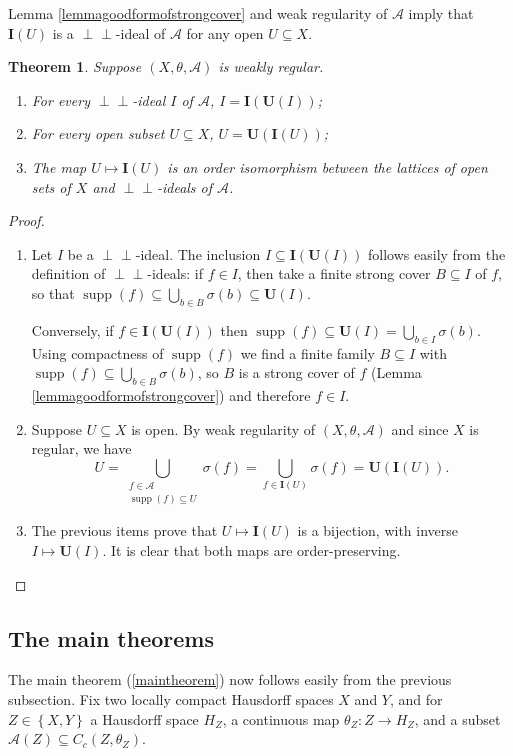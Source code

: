 \documentclass[letter,11pt]{amsart}
\theoremstyle{plain}		\newtheorem{theorem}[generalnumbering]{Theorem}
\theoremstyle{plain}		\newtheorem{corollary}[generalnumbering]{Corollary}
\theoremstyle{definition}		\newtheorem{definition}[generalnumbering]{Definition}
\theoremstyle{definition}		\newtheorem{example}[generalnumbering]{Example}
\theoremstyle{plain}		\newtheorem{proposition}[generalnumbering]{Proposition}
\theoremstyle{plain}		\newtheorem{lemma}[generalnumbering]{Lemma}
\theoremstyle{plain}    \newtheorem{plainstyle}[generalnumbering]{\namefordifferentenvironment}
\theoremstyle{plain}    \newtheorem*{plainstyle*}{\namefordifferentenvironment}
\theoremstyle{definition}    \newtheorem{definitionstyle}[generalnumbering]{\namefordifferentenvironment}
\theoremstyle{definition}    \newtheorem*{definitionstyle*}{\namefordifferentenvironment}
\newcommand{\perpp}{\perp\!\!\!\perp}
\DeclareMathOperator{\supp}{supp}
\begin{document}
Lemma \ref{lemmagoodformofstrongcover} and weak regularity of $\mathcal{A}$ imply that $\mathbf{I}(U)$ is a $\perpp$-ideal of $\mathcal{A}$ for any open $U\subseteq X$.

\begin{theorem}\label{theoremperppideals}
	Suppose $(X,\theta,\mathcal{A})$ is weakly regular.
	\begin{enumerate}[label=(\alph*)]
		\item\label{theoremperppideals(a)} For every $\perpp$-ideal $I$ of $\mathcal{A}$, $I=\mathbf{I}(\mathbf{U}(I))$;
		\item\label{theoremperppideals(b)} For every open subset $U\subseteq X$, $U=\mathbf{U}(\mathbf{I}(U))$;
		\item\label{theoremperppideals(c)} The map $U\mapsto\mathbf{I}(U)$ is an order isomorphism between the lattices of open sets of $X$ and $\perpp$-ideals of $\mathcal{A}$.
	\end{enumerate}
\end{theorem}
\begin{proof}
	\begin{enumerate}[label=(\alph*)]
		\item Let $I$ be a $\perpp$-ideal. The inclusion $I\subseteq \mathbf{I}(\mathbf{U}(I))$ follows easily from the definition of $\perpp$-ideals: if $f\in I$, then take a finite strong cover $B\subseteq I$ of $f$, so that $\supp(f)\subseteq\bigcup_{b\in B}\sigma(b)\subseteq\mathbf{U}(I)$.
		
		Conversely, if $f\in\mathbf{I}(\mathbf{U}(I))$ then $\supp(f)\subseteq\mathbf{U}(I)=\bigcup_{b\in I}\sigma(b)$. Using compactness of $\supp(f)$ we find a finite family $B\subseteq I$ with $\supp(f)\subseteq\bigcup_{b\in B}\sigma(b)$, so $B$ is a strong cover of $f$ (Lemma \ref{lemmagoodformofstrongcover}) and therefore $f\in I$.
		\item Suppose $U\subseteq X$ is open. By weak regularity of $(X,\theta,\mathcal{A})$ and since $X$ is regular, we have
		\[U=\bigcup_{\substack{f\in\mathcal{A}\\\supp(f)\subseteq U}}\sigma(f)=\bigcup_{f\in\mathbf{I}(U)}\sigma(f)=\mathbf{U}(\mathbf{I}(U)).\]
		\item The previous items prove that $U\mapsto\mathbf{I}(U)$ is a bijection, with inverse $I\mapsto\mathbf{U}(I)$. It is clear that both maps are order-preserving.\qedhere
	\end{enumerate}
\end{proof}


\subsection{The main theorems}
The main theorem (\ref{maintheorem}) now follows easily from the previous subsection. Fix two locally compact Hausdorff spaces $X$ and $Y$, and for $Z\in\left\{X,Y\right\}$ a Hausdorff space $H_Z$, a continuous map $\theta_Z\colon Z\to H_Z$, and a subset $\mathcal{A}(Z)\subseteq C_c(Z,\theta_Z)$.
\end{document}
